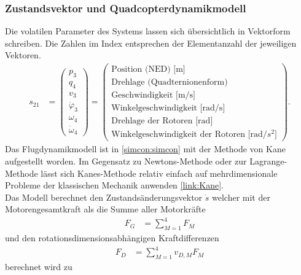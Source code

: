 \subsubsection{Zustandsvektor und Quadcopterdynamikmodell}
Die volatilen Parameter des Systems lassen sich übersichtlich in Vektorform schreiben. Die Zahlen im Index entsprechen der Elementanzahl der jeweiligen Vektoren.
\begin{align}
	s_{21} &= 
	\begin{pmatrix}
		p_3\\
		q_4\\
		v_3\\
		\dot{\varphi} _3\\
		\omega_4\\
		\dot{\omega}_4
	\end{pmatrix}
	=
	\begin{pmatrix}
		\text{Position (NED) [m]}\\
		\text{Drehlage (Quadternionenform)}\\
		\text{Geschwindigkeit [m/s]}\\
		\text{Winkelgeschwindigkeit [rad/s]}\\
		\text{Drehlage der Rotoren [rad]}\\
		\text{Winkelgeschwindigkeit der Rotoren [rad/$s^2$]}
	\end{pmatrix}.
\end{align}
Das Flugdynamikmodell ist in \ref{simcon:simcon} mit der Methode von Kane aufgestellt worden. Im Gegensatz zu Newtons-Methode oder zur Lagrange-Methode lässt sich Kanes-Methode relativ einfach auf mehrdimensionale Probleme der klassischen Mechanik anwenden \ref{link:Kane}.\\
Das Modell berechnet den Zustandsänderungsvektor $\dot{s}$ welcher mit der Motorengesamtkraft als die Summe aller Motorkräfte
\begin{align}
	F_G &= \sum_{M=1}^4 F_M
\end{align}
und den rotationsdimensionsabhängigen Kraftdifferenzen 
\begin{align}
	F_{D} &= \sum_{M=1}^4 v_{D,M}F_M
\end{align}
berechnet wird zu
